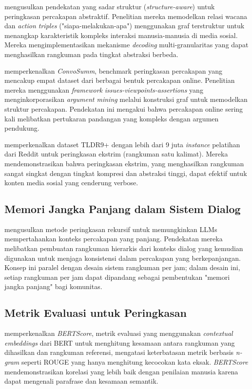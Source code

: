 \textcite{chen2021} mengusulkan pendekatan yang sadar struktur (\textit{structure-aware}) untuk peringkasan percakapan abstraktif. Penelitian mereka memodelkan relasi wacana dan \textit{action triples} ("siapa-melakukan-apa") menggunakan graf terstruktur untuk menangkap karakteristik kompleks interaksi manusia-manusia di media sosial. Mereka mengimplementasikan mekanisme \textit{decoding} multi-granularitas yang dapat menghasilkan rangkuman pada tingkat abstraksi berbeda.

\textcite{fabbri2021} memperkenalkan \textit{ConvoSumm}, benchmark peringkasan percakapan yang mencakup empat dataset dari berbagai bentuk percakapan online. Penelitian mereka menggunakan \textit{framework} \textit{issues-viewpoints-assertions} yang menginkorporasikan \textit{argument mining} melalui konstruksi graf untuk memodelkan struktur percakapan. Pendekatan ini mengakui bahwa percakapan online sering kali melibatkan pertukaran pandangan yang kompleks dengan argumen pendukung.

\textcite{sotudeh2021} memperkenalkan dataset TLDR9+ dengan lebih dari 9 juta \textit{instance} pelatihan dari Reddit untuk peringkasan ekstrim (rangkuman satu kalimat). Mereka mendemonstrasikan bahwa peringkasan ekstrim, yang menghasilkan rangkuman sangat singkat dengan tingkat kompresi dan abstraksi tinggi, dapat efektif untuk konten media sosial yang cenderung verbose.

\subsection{Memori Jangka Panjang dalam Sistem Dialog}

\textcite{wang2023recursive} mengusulkan metode peringkasan rekursif untuk memungkinkan LLMs mempertahankan konteks percakapan yang panjang. Pendekatan mereka melibatkan pembuatan rangkuman hierarkis dari konteks dialog yang kemudian digunakan untuk menjaga konsistensi dalam percakapan yang berkepanjangan. Konsep ini paralel dengan desain sistem rangkuman per jam; dalam desain ini, setiap rangkuman per jam dapat dipandang sebagai pembentukan "memori jangka panjang" bagi komunitas.

\subsection{Metrik Evaluasi untuk Peringkasan}

\textcite{zhang2020bertscore} memperkenalkan \textit{BERTScore}, metrik evaluasi yang menggunakan \textit{contextual embeddings} dari BERT untuk menghitung kesamaan antara rangkuman yang dihasilkan dan rangkuman referensi, mengatasi keterbatasan metrik berbasis \textit{n-gram} seperti ROUGE yang hanya menghitung kecocokan kata eksak. \textit{BERTScore} mendemonstrasikan korelasi yang lebih baik dengan penilaian manusia karena dapat mengenali parafrase dan kesamaan semantik.

